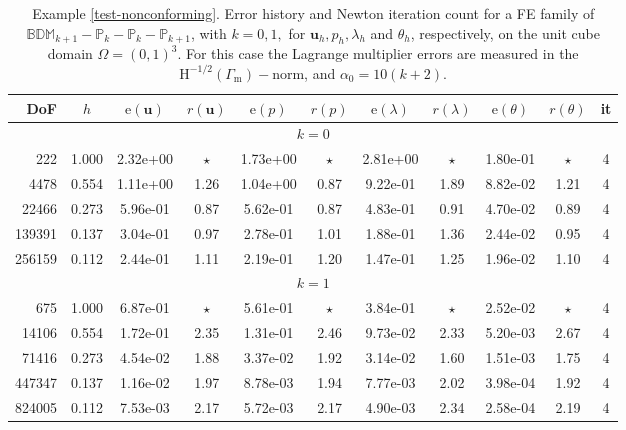 \documentclass[onefignum,onetabnum,reqno,a4paper,final]{siamart250211}
\def\O{\Omega}
\newcommand\bu{\boldsymbol{u}}
\newcommand\0{\mathbf{0}}
\renewcommand\H{\mathrm{H}}
\renewcommand\O{\Omega}
\newcommand\Gm{\Gamma_{\mathrm{m}}}
\numberwithin{figure}{section}
\numberwithin{table}{section}
\begin{document}
\begin{table}[t!]
		\setlength{\tabcolsep}{3.5pt}
		\centering 
		{\small\begin{tabular}{|rcccccccccc|}
				\hline\hline
				DoF   &   $h$  & $\mathrm{e}(\bu)$  &   $r(\bu)$   &   $\mathrm{e}(p)$  &   $r(p)$  &  $\mathrm{e}(\lambda)$  &   $r(\lambda) $ &  $\mathrm{e}(\theta)$  &  $r(\theta)$  &   it \\
				\hline 
				\multicolumn{11}{|c|}{$k=0$} \\
				\hline
   222 & 1.000 & 2.32e+00 & $\star$ & 1.73e+00 & $\star$ & 2.81e+00 & $\star$ & 1.80e-01 & $\star$ &  4 \\
  4478 & 0.554 & 1.11e+00 & 1.26 & 1.04e+00 & 0.87 & 9.22e-01 & 1.89 & 8.82e-02 & 1.21 &  4 \\
 22466 & 0.273 & 5.96e-01 & 0.87 & 5.62e-01 & 0.87 & 4.83e-01 & 0.91 & 4.70e-02 & 0.89 &  4 \\
139391 & 0.137 & 3.04e-01 & 0.97 & 2.78e-01 & 1.01 & 1.88e-01 & 1.36 & 2.44e-02 & 0.95 &  4 \\
256159 & 0.112 & 2.44e-01 & 1.11 & 2.19e-01 & 1.20 & 1.47e-01 & 1.25 & 1.96e-02 & 1.10 &  4 \\
\hline
				\multicolumn{11}{|c|}{$k=1$}\\
				\hline

                      675 & 1.000 & 6.87e-01 & $\star$ & 5.61e-01 & $\star$ & 3.84e-01 & $\star$ & 2.52e-02 & $\star$ &  4 \\
 14106 & 0.554 & 1.72e-01 & 2.35 & 1.31e-01 & 2.46 & 9.73e-02 & 2.33 & 5.20e-03 & 2.67 &  4 \\
 71416 & 0.273 & 4.54e-02 & 1.88 & 3.37e-02 & 1.92 & 3.14e-02 & 1.60 & 1.51e-03 & 1.75 &  4 \\
447347 & 0.137 & 1.16e-02 & 1.97 & 8.78e-03 & 1.94 & 7.77e-03 & 2.02 & 3.98e-04 & 1.92 &  4 \\
824005 & 0.112 & 7.53e-03 & 2.17 & 5.72e-03 & 2.17 & 4.90e-03 & 2.34 & 2.58e-04 & 2.19 &  4 \\
				\hline
				\hline
		\end{tabular}}
		\smallskip
		\caption{Example \ref{test-nonconforming}. Error history and Newton iteration count for a FE family of $\mathbb{BDM}_{k+1}-\mathbb{P}_{k}- \mathbb{P}_{k} - \mathbb{P}_{k+1}$, with $k=0,1,$ for $\bu_h, p_h,\lambda_h$ and $\theta_h$, respectively, on the unit cube domain $\O=(0,1)^3$. For this case the Lagrange multiplier errors are measured in the $\H^{-1/2}(\Gm)-$norm, and $\alpha_0=10(k+2)$. }
		\label{tables-3D}
	\end{table}
\end{document}
